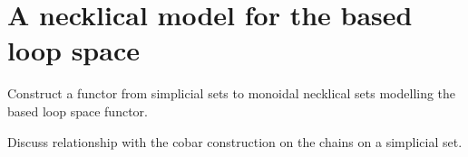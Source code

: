 \section{A necklical model for the based loop space}

Construct a functor from simplicial sets to monoidal necklical sets modelling the based loop space functor. 

Discuss relationship with the cobar construction on the chains on a simplicial set. 